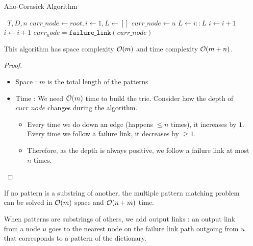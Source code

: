 \documentclass{cours}
\begin{document}
\begin{algorithm}
    \caption{Aho-Corasick Algorithm}
    \begin{algorithmic}
        \Input \ $T, D, n$
        \EndInput
        \State $curr\_node \gets root, i \gets 1, L \gets []$
                \State $curr\_node \gets u$
                    \State $L \gets i :: L$
                \EndIf
                \State $i \gets i + 1$
            \Else
                    \State $i \gets i + 1$
                \Else
                    \State $curr_node = \texttt{failure\_link}(curr\_node)$
                \EndIf
            \EndIf
        \EndWhile
    \end{algorithmic}
\end{algorithm}

\begin{proposition}
    This algorithm has space complexity $\mathcal{O}(m)$ and time complexity $\mathcal{O}(m + n)$.
\end{proposition}
\begin{proof}
    \begin{itemize}
        \item Space : $m$ is the total length of the patterns
        \item Time : We need $\mathcal{O}(m)$ time to build the trie. Consider how the depth of $curr\_node$ changes during the algorithm.
        \begin{itemize}
            \item Every time we do down an edge (happens $\leq n$ times), it increases by $1$. Every time we follow a failure link, it decreases by $\geq 1$.
            \item Therefore, as the depth is always positive, we follow a failure link at most $n$ times.
        \end{itemize}
    \end{itemize}
\end{proof}

\begin{theorem}
    If no pattern is a substring of another, the multiple pattern matching problem can be solved in $\mathcal{O}(m)$ space and $\mathcal{O}(n + m)$ time.
\end{theorem}

\begin{definition}
    When patterns are substrings of others, we add output links : an output link from a node $u$ goes to the nearest node on the failure link path outgoing from $u$ that corresponds to a pattern of the dictionary.
\end{definition}
\end{document}
